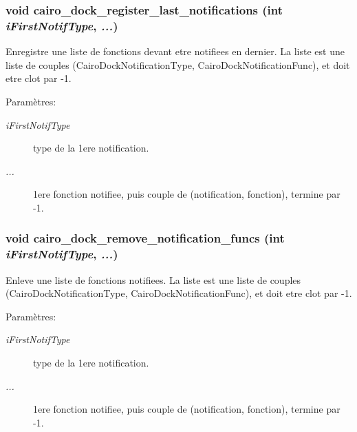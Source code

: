 \subsubsection{\setlength{\rightskip}{0pt plus 5cm}void cairo\_\-dock\_\-register\_\-last\_\-notifications (int {\em iFirstNotifType},  {\em ...})}\label{cairo-dock-notifications_8h_43af2cd20c3f208f40c025efae51cda6}


Enregistre une liste de fonctions devant etre notifiees en dernier. La liste est une liste de couples (CairoDockNotificationType, CairoDockNotificationFunc), et doit etre clot par -1. \begin{Desc}
\item[Paramètres:]
\begin{description}
\item[{\em iFirstNotifType}]type de la 1ere notification. \item[{\em ...}]1ere fonction notifiee, puis couple de (notification, fonction), termine par -1. \end{description}
\end{Desc}
\subsubsection{\setlength{\rightskip}{0pt plus 5cm}void cairo\_\-dock\_\-remove\_\-notification\_\-funcs (int {\em iFirstNotifType},  {\em ...})}\label{cairo-dock-notifications_8h_4ef98c22645a91ab4ddba1a1df695d3e}


Enleve une liste de fonctions notifiees. La liste est une liste de couples (CairoDockNotificationType, CairoDockNotificationFunc), et doit etre clot par -1. \begin{Desc}
\item[Paramètres:]
\begin{description}
\item[{\em iFirstNotifType}]type de la 1ere notification. \item[{\em ...}]1ere fonction notifiee, puis couple de (notification, fonction), termine par -1. \end{description}
\end{Desc}
